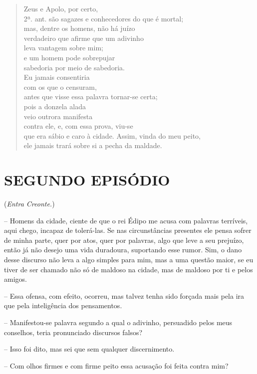 \begin{verse}
Zeus e Apolo, por certo,\\ 2ª. ant.
são sagazes e conhecedores do que é mortal;\\
mas, dentre os homens, não há juízo\\
verdadeiro que afirme que um adivinho \\
leva vantagem sobre mim;\\
e um homem pode sobrepujar\\
sabedoria por meio de sabedoria.\\
Eu jamais consentiria\\
com os que o censuram,\\
antes que visse essa palavra tornar-se certa;\\
pois a donzela alada\\
veio outrora manifesta\\
contra ele, e, com essa prova, viu-se\\
que era sábio e caro à cidade. Assim, vinda do meu peito, \\
ele jamais trará sobre si a pecha da maldade.
\end{verse}

\section{SEGUNDO EPISÓDIO}

(\emph{Entra Creonte.})

 --   Homens da cidade, ciente de que o rei Édipo me acusa com palavras
terríveis, aqui chego, incapaz de tolerá-las. Se nas circunstâncias
presentes ele pensa sofrer de minha parte, quer por atos, quer por
palavras, algo que leve a seu prejuízo, então já não  desejo uma
vida duradoura, suportando esse rumor. Sim, o dano desse discurso não
leva a algo simples para mim, mas a uma questão maior, se eu tiver de
ser chamado não só de maldoso na cidade, mas de maldoso por ti e pelos
amigos.

 --   Essa ofensa, com efeito, ocorreu, mas talvez tenha sido forçada mais
pela ira que pela inteligência dos pensamentos.

 --   Manifestou-se palavra segundo a qual o adivinho, persuadido pelos meus
conselhos, teria pronunciado discursos falsos?

 --   Isso foi dito, mas sei que sem qualquer discernimento.

 --   Com olhos firmes e com firme peito essa acusação foi feita contra mim?

